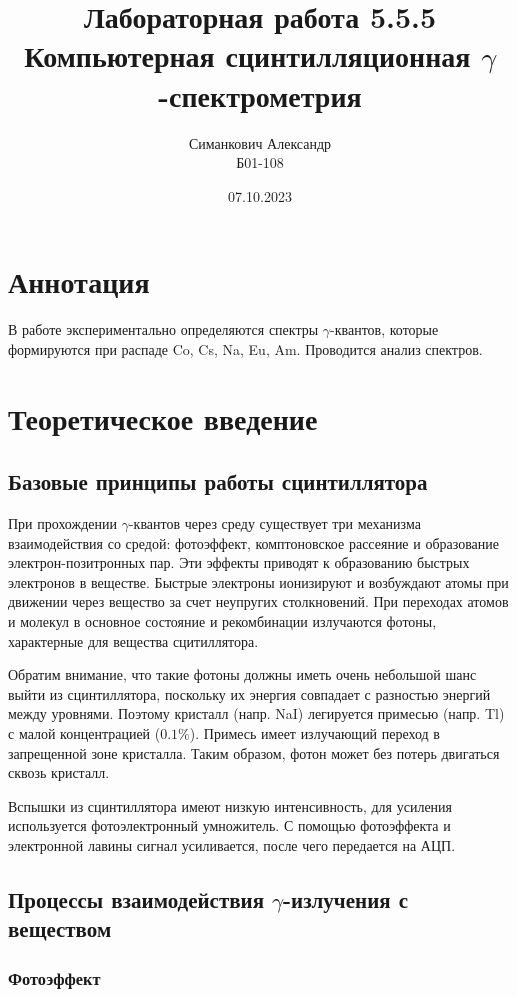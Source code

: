 \documentclass[12pt,a4paper]{article}
\title{Лабораторная работа 5.5.5 \\ Компьютерная сцинтилляционная $\gamma$-спектрометрия}
\author{Симанкович Александр\\ Б01-108}
\date{07.10.2023}
\begin{document}
	\maketitle
	
	\section*{Аннотация}
	
	В работе экспериментально определяются спектры $\gamma$-квантов, которые формируются при распаде Co, Cs, Na, Eu, Am. Проводится анализ спектров.
	
	\section*{Теоретическое введение}
	
	\subsection*{Базовые принципы работы сцинтиллятора}
	
	При прохождении $\gamma$-квантов через среду существует три механизма взаимодействия со средой: фотоэффект, комптоновское рассеяние и образование электрон-позитронных пар. Эти эффекты приводят к образованию быстрых электронов в веществе. Быстрые электроны ионизируют и возбуждают атомы при движении через вещество за счет неупругих столкновений. При переходах атомов и молекул в основное состояние и рекомбинации излучаются фотоны, характерные для вещества сцитиллятора.
	
	Обратим внимание, что такие фотоны должны иметь очень небольшой шанс выйти из сцинтиллятора, поскольку их энергия совпадает с разностью энергий между уровнями. Поэтому кристалл (напр. NaI) легируется примесью (напр. Tl) с малой концентрацией ($0.1\%$). Примесь имеет излучающий переход в запрещенной зоне кристалла. Таким образом, фотон может без потерь двигаться сквозь кристалл.
	
	Вспышки из сцинтиллятора имеют низкую интенсивность, для усиления используется фотоэлектронный умножитель. С помощью фотоэффекта и электронной лавины сигнал усиливается, после чего передается на АЦП.
	
	\subsection*{Процессы взаимодействия $\gamma$-излучения с веществом}
	
	\subsubsection*{Фотоэффект}
	
\end{document}
